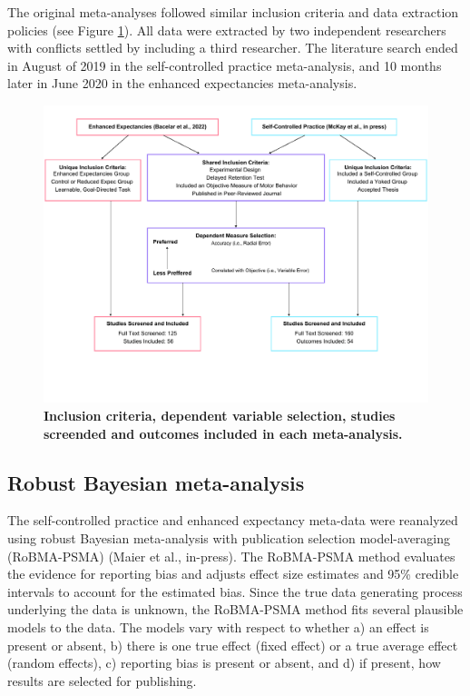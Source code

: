 \documentclass[
  doc, donotrepeattitle,floatsintext]{apa7}
\begin{document}
The original meta-analyses followed similar inclusion criteria and data extraction policies (see Figure \ref{fig:fig1}). All data were extracted by two independent researchers with conflicts settled by including a third researcher. The literature search ended in August of 2019 in the self-controlled practice meta-analysis, and 10 months later in June 2020 in the enhanced expectancies meta-analysis.

\begin{figure}

{\centering \includegraphics{../../figs/fig1} 

}

\caption{\normalfont \small \textbf{Inclusion criteria, dependent variable selection, studies screended and outcomes included in each meta-analysis.}}\label{fig:fig1}
\end{figure}



\hypertarget{robust-bayesian-meta-analysis}{%
\subsection{Robust Bayesian meta-analysis}\label{robust-bayesian-meta-analysis}}

The self-controlled practice and enhanced expectancy meta-data were reanalyzed using robust Bayesian meta-analysis with publication selection model-averaging (RoBMA-PSMA) (Maier et al., in-press). The RoBMA-PSMA method evaluates the evidence for reporting bias and adjusts effect size estimates and 95\% credible intervals to account for the estimated bias. Since the true data generating process underlying the data is unknown, the RoBMA-PSMA method fits several plausible models to the data. The models vary with respect to whether a) an effect is present or absent, b) there is one true effect (fixed effect) or a true average effect (random effects), c) reporting bias is present or absent, and d) if present, how results are selected for publishing.
\end{document}
